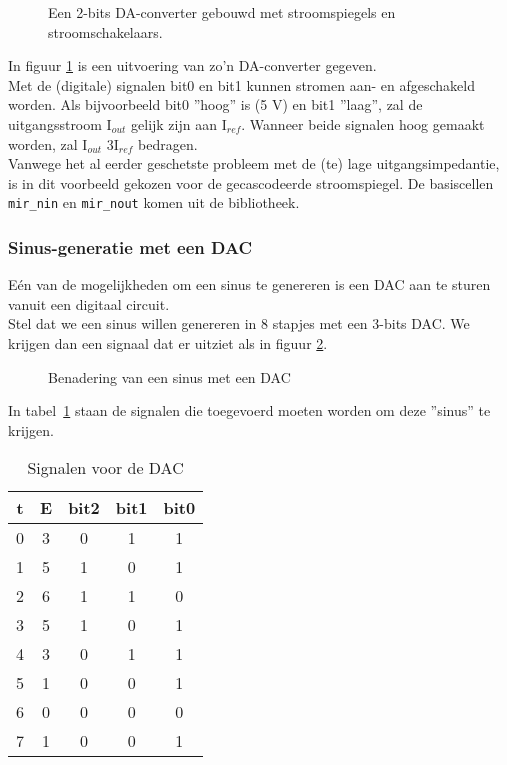 \begin{figure}[bth]
\centerline{}
\caption{Een 2-bits DA-converter gebouwd met stroomspiegels en stroomschakelaars.}
\label{dac}
\end{figure}
 
In figuur \ref{dac} is een uitvoering van zo'n DA-converter gegeven.\\
Met de (digitale) signalen bit0 en bit1 kunnen stromen aan- en afgeschakeld worden.
Als bijvoorbeeld bit0 ''hoog'' is (5 V) en bit1 ''laag'',
zal de uitgangsstroom I$_{out}$ gelijk zijn aan I$_{re\!f}$.
Wanneer beide signalen hoog gemaakt worden,
zal I$_{out}$ 3I$_{re\!f}$ bedragen.\\
Vanwege het al eerder geschetste probleem met de (te) lage uitgangsimpedantie, is in dit voorbeeld gekozen voor de gecascodeerde stroomspiegel.
De basiscellen {\tt mir\_nin} en {\tt mir\_nout} komen uit de bibliotheek.  

\subsubsection{Sinus-generatie met een DAC}

E\'en van de mogelijkheden om een sinus te genereren is een DAC aan te sturen vanuit een digitaal circuit.\\
Stel dat we een sinus willen genereren in 8 stapjes met een 3-bits DAC.
We krijgen dan een signaal dat er uitziet als in figuur \ref{sindig}.

\begin{figure}[bth]
\centerline{}
\caption{Benadering van een sinus met een DAC}
\label{sindig}
\end{figure}

In tabel~\ref{tabel1} staan de signalen die toegevoerd moeten worden om deze ''sinus'' te krijgen.

\begin{table}[htb]
\begin{center}
\caption{Signalen voor de DAC\label{tabel1}}
\medskip
\begin{tabular}{|c|c|ccc|}
\hline
t	&E	&bit2	&bit1	&bit0\\
\hline
0	&3	&0	&1	&1\\
1	&5	&1	&0	&1\\
2	&6	&1	&1	&0\\
3	&5	&1	&0	&1\\
4	&3	&0	&1	&1\\
5	&1	&0	&0	&1\\
6	&0	&0	&0	&0\\
7	&1	&0	&0	&1\\
\hline
\end{tabular}
\end{center}
\end{table}

